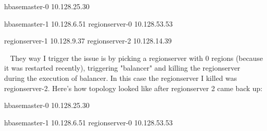 \documentclass{report}%
\begin{document}
\begin{enumerate}
\begin{spverbatim}
hbasemaster-0 10.128.25.30

hbasemaster-1 10.128.6.51
regionserver-0 10.128.53.53

regionserver-1 10.128.9.37
regionserver-2 10.128.14.39\end{spverbatim}\ \newline%
\newline%
\newline%
\newline%
\newline%
\newline%
They way I trigger the issue is by picking a regionserver with 0 regions (because it was restarted recently), triggering "balancer" and killing the regionserver during the execution of balancer. In this case the regionserver I killed was regionserver{-}2. Here's how topology looked like after regionserver 2 came back up:\newline%
\newline%
\newline%
\newline%
\newline%
\newline%
\begin{spverbatim}

hbasemaster-0 10.128.25.30

hbasemaster-1 10.128.6.51
regionserver-0 10.128.53.53


\end{spverbatim}
\end{enumerate}
\end{document}
